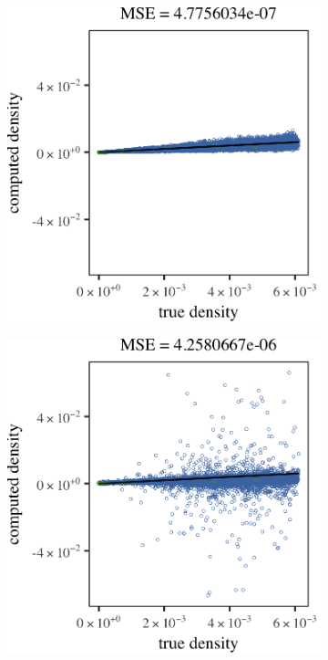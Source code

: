 		\begin{figure}
			\centering
			\begin{subfigure}{0.7\columnwidth}
				\centering
				\includegraphics[width=\textwidth]{4/img/noOutliers/results_baakman_1_60000_mbe_silverman_no_outliers.png}
				\caption{\mbe}
				\label{fig:results:baakman1:noOutliers:mbe}
			\end{subfigure}
			\begin{subfigure}{0.7\columnwidth}
				\centering
				\includegraphics[width=\textwidth]{4/img/noOutliers/results_baakman_1_60000_sambe_silverman_no_outliers.png}

\end{subfigure}
\end{figure}

